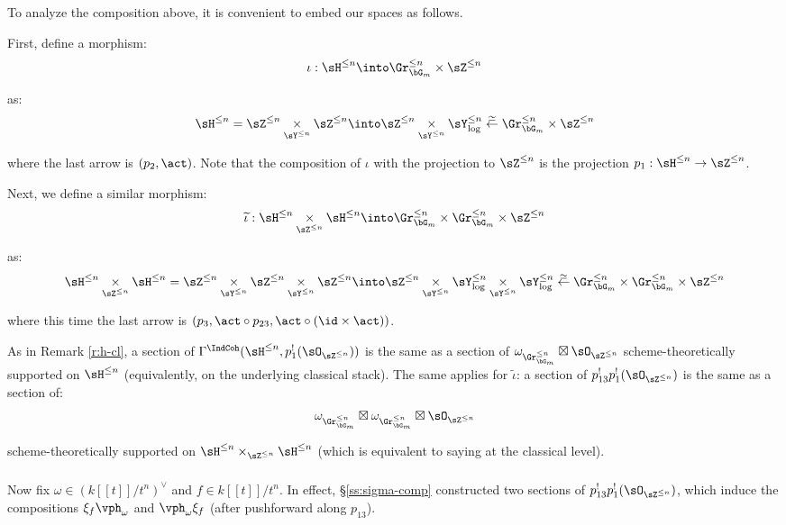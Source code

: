 To analyze the composition above,
it is convenient to embed our spaces as follows.

First, define a morphism:
%
\[
\iota:\sH^{\leq n} \into \Gr_{\bG_m}^{\leq n} \times \sZ^{\leq n}
\]

 as:
%
\[
\sH^{\leq n} =
\sZ^{\leq n} \underset{\sY^{\leq n}}{\times} \sZ^{\leq n}
\into
\sZ^{\leq n} \underset{\sY^{\leq n}}{\times} \sY_{\log}^{\leq n}
\overset{\simeq}{\leftarrow} \Gr_{\bG_m}^{\leq n} \times \sZ^{\leq n}
\]

 where the last arrow is $(p_2,\act)$. Note that
the composition of $\iota$ with the projection to $\sZ^{\leq n}$
is the projection $p_1:\sH^{\leq n} \to \sZ^{\leq n}$.

Next, we define a similar morphism:
%
\[
\widetilde{\iota}:
\sH^{\leq n} \underset{\sZ^{\leq n}}{\times}
\sH^{\leq n} \into
\Gr_{\bG_m}^{\leq n} \times \Gr_{\bG_m}^{\leq n} \times \sZ^{\leq n}
\]

 as:
%
\[
\sH^{\leq n} \underset{\sZ^{\leq n}}{\times}
\sH^{\leq n} =
\sZ^{\leq n} \underset{\sY^{\leq n}}{\times} \sZ^{\leq n}
\underset{\sY^{\leq n}}{\times} \sZ^{\leq n}
\into
\sZ^{\leq n} \underset{\sY^{\leq n}}{\times} \sY_{\log}^{\leq n}
\underset{\sY^{\leq n}}{\times} \sY_{\log}^{\leq n}
\overset{\simeq}{\leftarrow}
\Gr_{\bG_m}^{\leq n} \times \Gr_{\bG_m}^{\leq n} \times \sZ^{\leq n}
\]

 where this time the last arrow is
$(p_3,\act \circ p_{23}, \act \circ (\id \times \act))$.

As in Remark \ref{r:h-cl}, a section of
$\Gamma^{\IndCoh}(\sH^{\leq n},p_1^!(\sO_{\sZ^{\leq n}}))$
is the same as a section of
$\omega_{\Gr_{\bG_m}^{\leq n}} \boxtimes \sO_{\sZ^{\leq n}}$
scheme-theoretically supported on $\sH^{\leq n}$
(equivalently, on the underlying classical stack).
The same applies for
$\widetilde{\iota}$: a section
of $p_{13}^!p_1^!(\sO_{\sZ^{\leq n}})$ is the same
as a section of:
%
\[
\omega_{\Gr_{\bG_m}^{\leq n}} \boxtimes \omega_{\Gr_{\bG_m}^{\leq n}} \boxtimes \sO_{\sZ^{\leq n}}
\]

 scheme-theoretically supported on
$\sH^{\leq n} \times_{\sZ^{\leq n}} \sH^{\leq n}$ (which is
equivalent to saying at the
classical level).

\subsubsection{}\label{sss:recipe}

Now fix $\omega \in (k[[t]]/t^n)^{\vee}$ and $f \in k[[t]]/t^n$.
In effect, \S \ref{ss:sigma-comp} constructed two sections of
$p_{13}^!p_1^!(\sO_{\sZ^{\leq n}})$, which
induce the compositions
$\xi_f\vph_{\omega}$ and $\vph_{\omega}\xi_f$ (after
pushforward along $p_{13}$).

